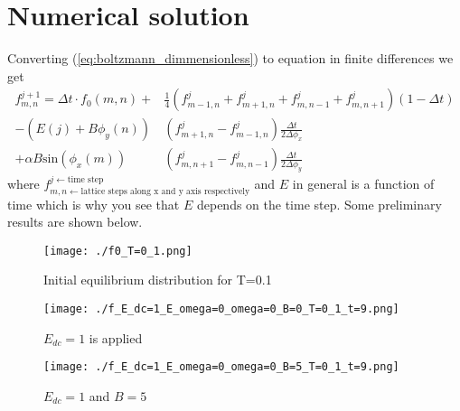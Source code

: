 \documentclass[40pt,letterpaper]{article}
\begin{document}
  \section{Numerical solution}
  Converting (\ref{eq:boltzmann_dimmensionless}) to equation in finite differences we get
  \begin{align}
   f^{j+1}_{m,n}=\Delta t\cdot f_0 (m,n)+& \frac{1}{4}\left ( f^j_{m-1,n} + f^j_{m+1,n} + f^j_{m,n-1} + f^j_{m,n+1} \right )(1-\Delta t) \nonumber \\
    -\left ( E(j) + B\phi_y(n)\right ) & \left ( f^j_{m+1,n} - f^j_{m-1,n} \right ) \frac{\Delta t}{2\Delta\phi_x} \nonumber \\
    +\alpha B\text{sin}(\phi_x(m)) & \left ( f^j_{m,n+1} - f^j_{m,n-1} \right )\frac{\Delta t}{2\Delta\phi_y}
  \end{align}
  where $f^{j\leftarrow\text{time step}}_{m,n \leftarrow\text{lattice steps along x and y axis respectively}}$ and $E$ in general is
  a function of time which is why you see that $E$ depends on the time step. Some preliminary results are shown below.

  \begin{figure}[p]
    \centering
    \texttt{[image: ./f0\_T=0\_1.png]}
    \caption{Initial equilibrium distribution for T=0.1}
    \label{fig:f0_plot}
  \end{figure}

  \begin{figure}[p]
    \centering
    \texttt{[image: ./f\_E\_dc=1\_E\_omega=0\_omega=0\_B=0\_T=0\_1\_t=9.png]}
    \caption{$E_{dc}=1$ is applied}
    \label{fig:f0_plot}
  \end{figure}
  
  \begin{figure}[p]
    \centering
    \texttt{[image: ./f\_E\_dc=1\_E\_omega=0\_omega=0\_B=5\_T=0\_1\_t=9.png]}
    \caption{$E_{dc}=1$ and $B=5$}
    \label{fig:f0_plot}
  \end{figure}
\end{document}
